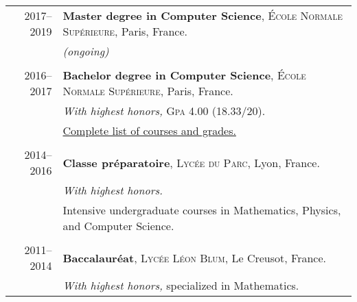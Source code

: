 \documentclass[a4paper,10pt]{article} %
\begin{document}
\begin{tabular}{r|l}	
  2017--2019 & \textbf{Master degree in Computer Science}, \textsc{\'Ecole Normale Supérieure}, Paris, France.\\
             & \emph{(ongoing)}\\
\multicolumn{2}{c}{} \\

  2016--2017 & \textbf{Bachelor degree in Computer Science}, \textsc{\'Ecole Normale Supérieure}, Paris, France.\\
             & \emph{With highest honors,} \textsc{Gpa} 4.00 (18.33/20). \\
             & \hyperlink{notes}{Complete list of courses and grades.} \\
\multicolumn{2}{c}{} \\

  2014--2016 & \textbf{Classe préparatoire}, \textsc{Lycée du Parc}, Lyon, France. \\
             & \emph{With highest honors.} \\
             & Intensive undergraduate courses in Mathematics, Physics, and Computer Science.\\
\multicolumn{2}{c}{} \\

  2011--2014 & \textbf{Baccalauréat}, \textsc{Lycée Léon Blum}, Le Creusot, France. \\
             & \emph{With highest honors,} specialized in Mathematics. \\






\end{tabular}
\end{document}
